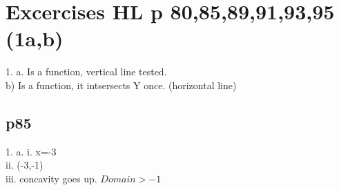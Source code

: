 \documentclass{article}
\begin{document}
  \section{Excercises HL p 80,85,89,91,93,95 (1a,b)}
  1. a. Is a function, vertical line tested.\\
  b) Is a function, it intsersects Y once. (horizontal line)\\
  \subsection{p85}
  1. a. i. x=-3\\
  ii. (-3,-1)\\
  iii. concavity goes up. $Domain>-1$\\


   
\end{document}

